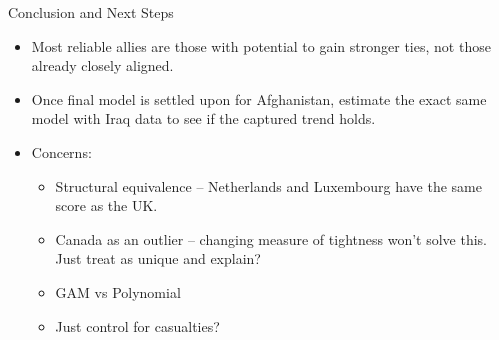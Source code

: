 \documentclass[11pt]{beamer}
\begin{document}
\begin{frame}{Conclusion and Next Steps}
  \begin{itemize}
    \item Most reliable allies are those with potential to gain stronger ties, not those already closely aligned.
    \item Once final model is settled upon for Afghanistan, estimate the exact same model with Iraq data to see if the captured trend holds.
    \item Concerns:
    \begin{itemize}
      \item Structural equivalence -- Netherlands and Luxembourg have the same score as the UK.
      \item Canada as an outlier -- changing measure of tightness won't solve this. Just treat as unique and explain?
      \item GAM vs Polynomial
      \item Just control for casualties?
    \end{itemize}
  \end{itemize}
\end{frame}
\end{document}
